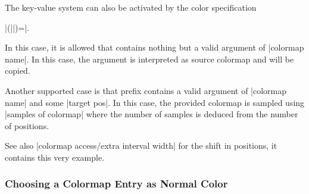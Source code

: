 

\noindent	The key-value system can also be activated by the color specification

	|(||)=|.

\noindent In this case, it is allowed that  contains nothing but a valid argument of |colormap name|. In this case, the argument is interpreted as source colormap and will be copied.
\begin{codeexample}[]
\pgfplotscolorbardrawstandalone[
	colormap={example}{%
	  of colormap={viridis}
	},
	colorbar horizontal,
	colormap access=const]
\end{codeexample}

\noindent Another supported case is that  prefix contains a valid argument of |colormap name| and some |target pos|. In this case, the provided colormap is sampled using |samples of colormap| where the number of samples is deduced from the number of positions.
\begin{codeexample}[]
\pgfplotscolorbardrawstandalone[
	colormap={example}{%
	  of colormap={viridis, 
	  	target pos={0,10,200,700,750,800,1000}
	  }
	},
	colorbar horizontal,
	colormap access=const]
\end{codeexample}
\noindent See also |colormap access/extra interval width| for the shift in positions, it contains this very example.

\subsubsection{Choosing a Colormap Entry as Normal Color}

